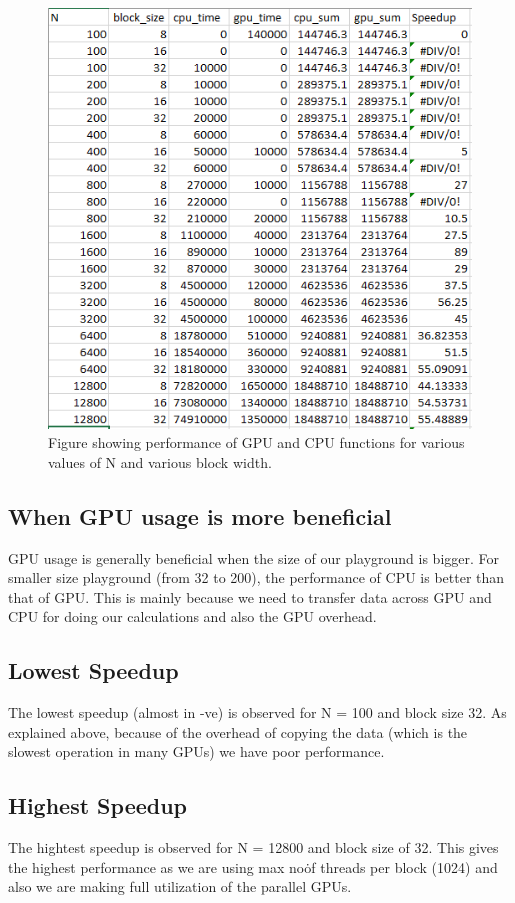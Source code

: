 \documentclass{article}
\begin{document}
\begin{figure}[ht!]
  \centering
  \includegraphics[width=1\textwidth]{speedup}
  \caption{Figure showing performance of GPU and CPU functions for various values of N and various block width.\label{fig:observation}}
\end{figure}

\subsection{When GPU usage is more beneficial}
GPU usage is generally beneficial when the size of our playground is bigger.  For smaller size playground (from 32 to 200), the performance of CPU is better than that of GPU\@.  This is mainly because we need to transfer data across GPU and CPU for doing our calculations and also the GPU overhead.
\subsection{Lowest Speedup}
The lowest speedup (almost in -ve) is observed for N = 100 and block size 32.  As explained above, because of the overhead of copying the data (which is the slowest operation in many GPUs) we have poor performance.
\subsection{Highest Speedup}
The hightest speedup is observed for N = 12800 and block size of 32.  This gives the highest performance as we are using max no\. of threads per block (1024) and also we are making full utilization of the parallel GPUs.
\end{document}
